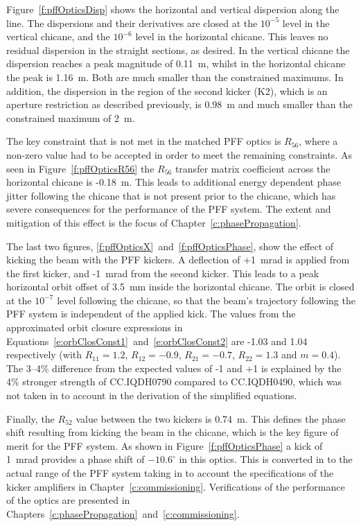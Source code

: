 Figure~\ref{f:pffOpticsDisp} shows the horizontal and vertical dispersion along the line. The dispersions and their derivatives are closed at the \(10^{-5}\) level in the vertical chicane, and the \(10^{-6}\) level in the horizontal chicane. This leaves no residual dispersion in the straight sections, as desired. In the vertical chicane the dispersion reaches a peak magnitude of 0.11~m, whilst in the horizontal chicane the peak is 1.16~m. Both are much smaller than the constrained maximums. In addition, the dispersion in the region of the second kicker (K2), which is an aperture restriction as described previously, is 0.98~m and much smaller than the constrained maximum of 2~m.

The key constraint that is not met in the matched PFF optics is \(R_{56}\), where a non-zero value had to be accepted in order to meet the remaining constraints. As seen in Figure~\ref{f:pffOpticsR56} the \(R_{56}\) transfer matrix coefficient across the horizontal chicane is -0.18~m. This leads to additional energy dependent phase jitter following the chicane that is not present prior to the chicane, which has severe consequences for the performance of the PFF system. The extent and mitigation of this effect is the focus of Chapter~\ref{c:phasePropagation}.

The last two figures, \ref{f:pffOpticsX}~and~\ref{f:pffOpticsPhase}, show the effect of kicking the beam with the PFF kickers. A deflection of +1~mrad is applied from the first kicker, and -1~mrad from the second kicker. This leads to a peak horizontal orbit offset of 3.5~mm inside the horizontal chicane. The orbit is closed at the \(10^{-7}\) level following the chicane, so that the beam's trajectory following the PFF system is independent of the applied kick. The values from the approximated orbit closure expressions in Equations~\ref{e:orbClosConst1}~and~\ref{e:orbClosConst2} are -1.03 and 1.04 respectively (with \(R_{11} = 1.2\), \(R_{12} = -0.9\), \(R_{21} = -0.7\), \(R_{22} = 1.3\) and \(m = 0.4\)). The 3--4\% difference from the expected values of -1 and +1 is explained by the 4\% stronger strength of CC.IQDH0790 compared to CC.IQDH0490, which was not taken in to account in the derivation of the simplified equations.

Finally, the \(R_{52}\) value between the two kickers is 0.74~m. This defines the phase shift resulting from kicking the beam in the chicane, which is the key figure of merit for the PFF system. As shown in Figure~\ref{f:pffOpticsPhase} a kick of 1~mrad provides a phase shift of \(-10.6^\circ\) in this optics. This is converted in to the actual range of the PFF system taking in to account the specifications of the kicker amplifiers in Chapter~\ref{c:commissioning}. Verifications of the performance of the optics are presented in Chapters~\ref{c:phasePropagation}~and~\ref{c:commissioning}.

